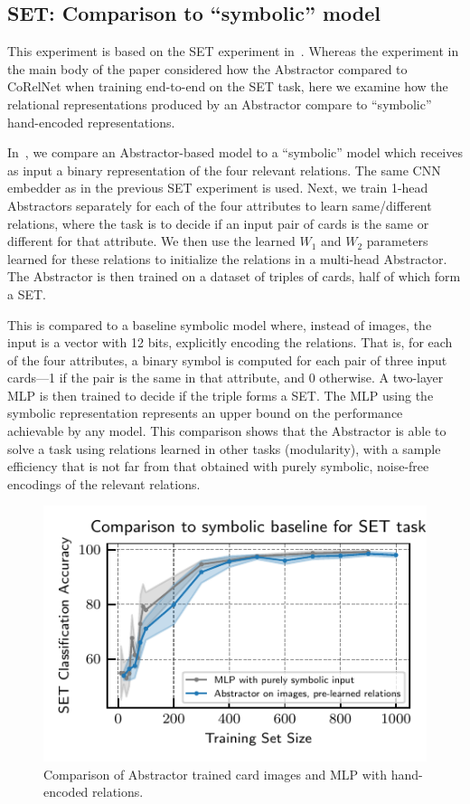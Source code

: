 \subsection{SET: Comparison to ``symbolic'' model}

This experiment is based on the SET experiment in~. Whereas the experiment in the main body of the paper considered how the Abstractor compared to CoRelNet when training end-to-end on the SET task, here we examine how the relational representations produced by an Abstractor compare to ``symbolic'' hand-encoded representations.

In~, we compare an Abstractor-based model to a ``symbolic'' model which receives as input a binary representation of the four relevant relations. The same CNN embedder as in the previous SET experiment is used. Next, we train 1-head Abstractors separately for each of the four attributes to learn same/different relations, where the task is to decide if an input pair of cards is the same or different for that attribute. We then use the learned $W_1$ and $W_2$ parameters learned for these relations to initialize the relations in a multi-head Abstractor. The Abstractor is then trained on a dataset of triples of cards, half of which form a SET.

This is compared to a baseline symbolic model where, instead of images, the input is a vector with 12 bits,
explicitly encoding the relations. That is, for each of the four attributes, a binary symbol is computed for each pair of three input cards---1 if the pair is the same in that attribute, and 0 otherwise. A two-layer MLP is then trained to decide if the triple forms a SET. The MLP using the symbolic representation represents an upper bound on the performance achievable by any model. This comparison shows that the Abstractor is able to solve a task using relations learned in other tasks (modularity), with a sample efficiency that is not far from that obtained with purely symbolic, noise-free encodings of the relevant relations.

\begin{figure}[ht]
    \centering

    \includegraphics{figures/experiments/set_symbolic_vs_abstractor.pdf}
    \caption{Comparison of Abstractor trained card images and MLP with hand-encoded relations.}%
    \label{fig:exp_set_symbolic}
\end{figure}
